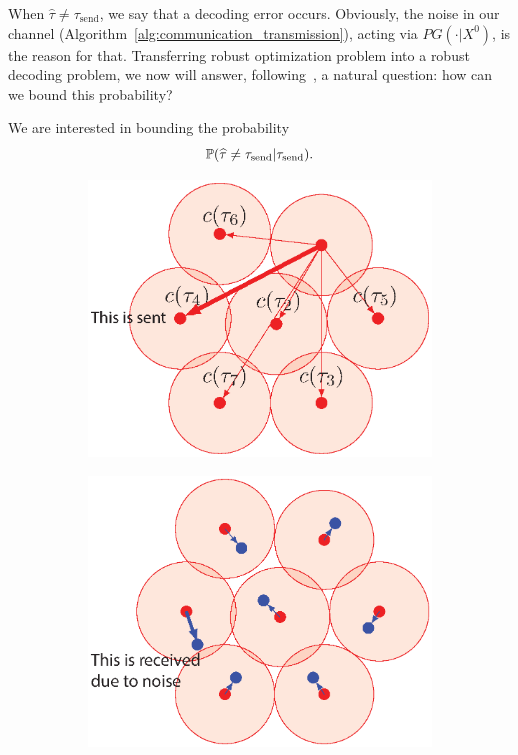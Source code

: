 When $\hat \tau \ne \tau_\text{send}$, we say that a decoding error occurs.
Obviously, the noise in our channel
(Algorithm~\ref{alg:communication_transmission}), acting via $PG(\cdot | X^0)$,
is the reason for that. Transferring robust optimization problem into a robust
decoding problem, we now will answer, following~\citet{conf/isit/Buhmann10}, a
natural question: how can we bound this probability?

We are interested in bounding the probability
\begin{equation}
  {\mathbb{P}}(\widehat \tau \ne \tau_\text{send} | \tau_\text{send}).
\end{equation}

\begin{figure}[th!]
  \centering
  \begin{subfigure}[b]{.48\textwidth}
      \includegraphics[width=\linewidth]{figures/ch_generic_approach/coding_scheme_1}
      \caption{}
      \label{fig:coding_scheme_cartoon_1}
  \end{subfigure}
  \hfill
  \begin{subfigure}[b]{.48\textwidth}
      \includegraphics[width=\linewidth]{figures/ch_generic_approach/coding_scheme_2}

\end{subfigure}
\end{figure}
